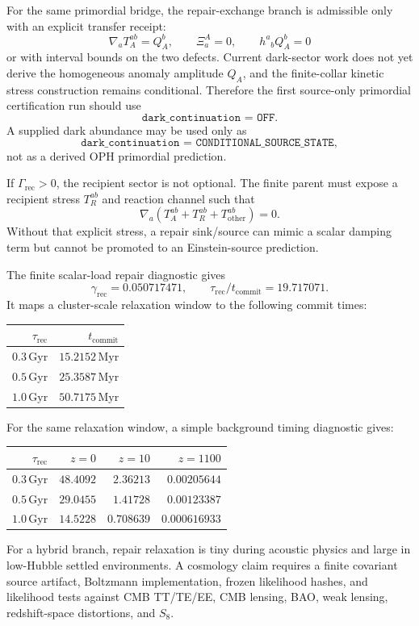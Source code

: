 \documentclass[11pt]{article}
\begin{document}
For the same primordial bridge, the repair-exchange branch is admissible only
with an explicit transfer receipt:
\begin{equation}
  \nabla_aT_A^{ab}=Q_A^b,\qquad
  \Xi_a^A=0,\qquad
  h^a{}_bQ_A^b=0
  \label{eq:repair-anomaly-primordial-contract}
\end{equation}
or with interval bounds on the two defects.  Current dark-sector work does not
yet derive the homogeneous anomaly amplitude \(Q_A\), and the finite-collar
kinetic stress construction remains conditional.  Therefore the first
source-only primordial certification run should use
\[
  \texttt{dark\_continuation = OFF}.
\]
A supplied dark abundance may be used only as
\[
  \texttt{dark\_continuation = CONDITIONAL\_SOURCE\_STATE},
\]
not as a derived OPH primordial prediction.

If \(\Gamma_{\mathrm{rec}}>0\), the recipient sector is not optional.  The
finite parent must expose a recipient stress \(T_R^{ab}\) and reaction channel
such that
\[
  \nabla_a(T_A^{ab}+T_R^{ab}+T_{\mathrm{other}}^{ab})=0 .
\]
Without that explicit stress, a repair sink/source can mimic a scalar damping
term but cannot be promoted to an Einstein-source prediction.

The finite scalar-load repair diagnostic gives
\[
  \gamma_{\mathrm{rec}}=0.050717471,
  \qquad
  \tau_{\mathrm{rec}}/t_{\mathrm{commit}}=19.717071 .
\]
It maps a cluster-scale relaxation window to the following commit times:
\begin{center}
\begin{tabular}{@{}rr@{}}
\toprule
\(\tau_{\mathrm{rec}}\) & \(t_{\mathrm{commit}}\) \\
\midrule
\(0.3\,\mathrm{Gyr}\) & \(15.2152\,\mathrm{Myr}\) \\
\(0.5\,\mathrm{Gyr}\) & \(25.3587\,\mathrm{Myr}\) \\
\(1.0\,\mathrm{Gyr}\) & \(50.7175\,\mathrm{Myr}\) \\
\bottomrule
\end{tabular}
\end{center}
For the same relaxation window, a simple background timing diagnostic gives:
\begin{center}
\begin{tabular}{@{}rrrr@{}}
\toprule
\(\tau_{\mathrm{rec}}\) & \(z=0\) & \(z=10\) & \(z=1100\) \\
\midrule
\(0.3\,\mathrm{Gyr}\) & \(48.4092\) & \(2.36213\) & \(0.00205644\) \\
\(0.5\,\mathrm{Gyr}\) & \(29.0455\) & \(1.41728\) & \(0.00123387\) \\
\(1.0\,\mathrm{Gyr}\) & \(14.5228\) & \(0.708639\) & \(0.000616933\) \\
\bottomrule
\end{tabular}
\end{center}
For a hybrid branch, repair relaxation is tiny during acoustic physics and
large in low-Hubble settled environments.  A cosmology claim requires a
finite covariant source artifact, Boltzmann implementation, frozen likelihood
hashes, and likelihood tests against CMB TT/TE/EE, CMB lensing, BAO, weak
lensing, redshift-space distortions, and \(S_8\).
\end{document}
